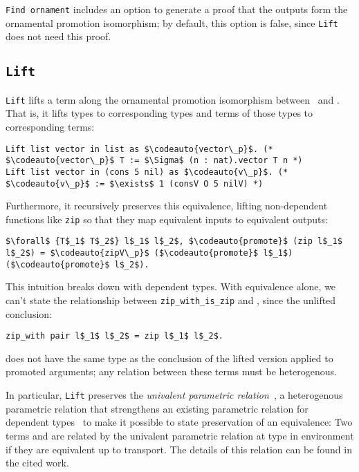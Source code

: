 \lstinline{Find ornament} includes an option to generate a proof that the outputs form the ornamental promotion isomorphism;
by default, this option is false, since \lstinline{Lift} does not need this proof.

\subsection{\lstinline{Lift}}
\label{sec:liftspec}

\lstinline{Lift} lifts a term along the ornamental promotion isomorphism between 
\Aa\ and \B. That is, it lifts types to corresponding types and terms of those types to corresponding terms:
\begin{lstlisting}
Lift list vector in list as $\codeauto{vector\_p}$. (* $\codeauto{vector\_p}$ T := $\Sigma$ (n : nat).vector T n *)
Lift list vector in (cons 5 nil) as $\codeauto{v\_p}$. (* $\codeauto{v\_p}$ := $\exists$ 1 (consV O 5 nilV) *)
\end{lstlisting}
Furthermore, it recursively preserves this equivalence, lifting non-dependent functions like \lstinline{zip}
so that they map equivalent inputs to equivalent outputs:
\begin{lstlisting}
$\forall$ {T$_1$ T$_2$} l$_1$ l$_2$, $\codeauto{promote}$ (zip l$_1$ l$_2$) = $\codeauto{zipV\_p}$ ($\codeauto{promote}$ l$_1$) ($\codeauto{promote}$ l$_2$).
\end{lstlisting}
This intuition breaks down with dependent types.
With equivalence alone, we can't state the relationship between \lstinline{zip_with_is_zip} 
and , since the unlifted conclusion:
\begin{lstlisting}
zip_with pair l$_1$ l$_2$ = zip l$_1$ l$_2$.
\end{lstlisting}
does not have the same type as the conclusion of the lifted version 
applied to promoted arguments; any relation between these terms must be heterogenous.

In particular, \lstinline{Lift} preserves the \textit{univalent parametric relation}~\cite{tabareau2017equivalences},
a heterogenous parametric relation that strengthens an existing parametric relation for dependent types~\cite{bernardy2012proofs}
to make it possible to state preservation of an equivalence:
Two terms  and  are related by the univalent parametric relation 
 at type  in environment \smallmath{$\Gamma$}
if they are equivalent up to transport. The details of this relation can be found in the cited work.

